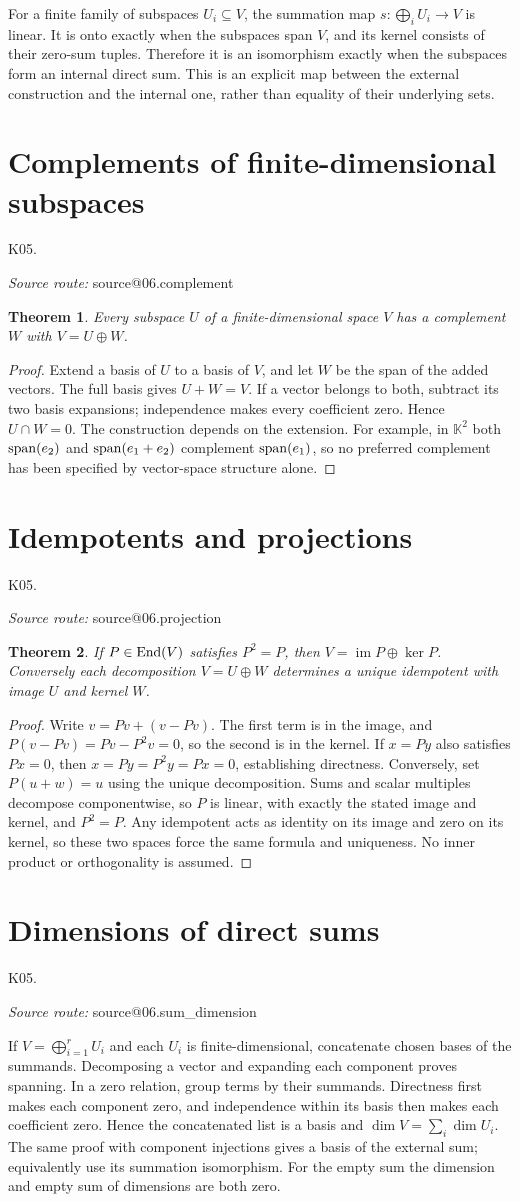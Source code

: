 \documentclass[11pt,a4paper]{book}
\makeatletter
\newtheorem{theorem}{Theorem}[chapter]
\theoremstyle{definition}\newtheorem{definition}[theorem]{Definition}
\theoremstyle{remark}\newtheorem{remark}[theorem]{Remark}
\newcommand{\K}{\mathbb K}\newcommand{\R}{\mathbb R}\newcommand{\C}{\mathbb C}
\DeclareMathOperator{\im}{im}\DeclareMathOperator{\rank}{rank}
\newcommand{\Kentry}[2]{\section{#2}\label{k:#1}\noindent\textsf{\small K05.\detokenize{#1}}\par
  \begingroup\small\color{black!65}\textit{Source route: }\csname source@#1\endcsname\par\endgroup}
\makeatother
\begin{document}
For a finite family of subspaces $U_i\subseteq V$, the summation map $s:\bigoplus_i U_i\to V$ is linear. It is onto exactly when the subspaces span $V$, and its kernel consists of their zero-sum tuples. Therefore it is an isomorphism exactly when the subspaces form an internal direct sum. This is an explicit map between the external construction and the internal one, rather than equality of their underlying sets.

\Kentry{06.complement}{Complements of finite-dimensional subspaces}
\begin{theorem}
Every subspace $U$ of a finite-dimensional space $V$ has a complement $W$ with $V=U\oplus W$.
\end{theorem}
\begin{proof}
Extend a basis of $U$ to a basis of $V$, and let $W$ be the span of the added vectors. The full basis gives $U+W=V$. If a vector belongs to both, subtract its two basis expansions; independence makes every coefficient zero. Hence $U\cap W=0$. The construction depends on the extension. For example, in $\K^2$ both $\operatorname{span}(e_2)$ and $\operatorname{span}(e_1+e_2)$ complement $\operatorname{span}(e_1)$, so no preferred complement has been specified by vector-space structure alone.
\end{proof}

\Kentry{06.projection}{Idempotents and projections}
\begin{theorem}
If $P\in\operatorname{End}(V)$ satisfies $P^2=P$, then $V=\im P\oplus\ker P$. Conversely each decomposition $V=U\oplus W$ determines a unique idempotent with image $U$ and kernel $W$.
\end{theorem}
\begin{proof}
Write $v=Pv+(v-Pv)$. The first term is in the image, and $P(v-Pv)=Pv-P^2v=0$, so the second is in the kernel. If $x=Py$ also satisfies $Px=0$, then $x=Py=P^2y=Px=0$, establishing directness. Conversely, set $P(u+w)=u$ using the unique decomposition. Sums and scalar multiples decompose componentwise, so $P$ is linear, with exactly the stated image and kernel, and $P^2=P$. Any idempotent acts as identity on its image and zero on its kernel, so these two spaces force the same formula and uniqueness. No inner product or orthogonality is assumed.
\end{proof}

\Kentry{06.sum_dimension}{Dimensions of direct sums}
If $V=\bigoplus_{i=1}^r U_i$ and each $U_i$ is finite-dimensional, concatenate chosen bases of the summands. Decomposing a vector and expanding each component proves spanning. In a zero relation, group terms by their summands. Directness first makes each component zero, and independence within its basis then makes each coefficient zero. Hence the concatenated list is a basis and $\dim V=\sum_i\dim U_i$. The same proof with component injections gives a basis of the external sum; equivalently use its summation isomorphism. For the empty sum the dimension and empty sum of dimensions are both zero.
\end{document}

